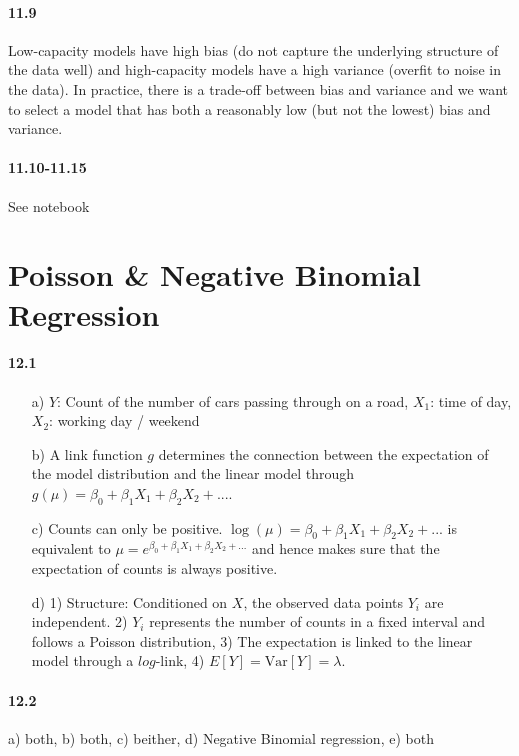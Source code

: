 \documentclass[fontsize=11pt,DIV=18,parskip=half]{scrartcl}
\begin{document}
\paragraph{11.9} Low-capacity models have high bias (do not capture the underlying structure of the data well) and high-capacity models have a high variance (overfit to noise in the data). In practice, there is a trade-off between bias and variance and we want to select a model that has both a reasonably low (but not the lowest) bias and variance.

\paragraph{11.10-11.15} See notebook

\section{Poisson \& Negative Binomial Regression}

\paragraph{12.1}
\begin{itemize}
\item[a)] $Y$: Count of the number of cars passing through on a road, $X_1$: time of day, $X_2$: working day / weekend
\item[b)] A link function $g$ determines the connection between the expectation of the model distribution and the linear model through $g(\mu) = \beta_0 + \beta_1 X_1 + \beta_2 X_2 + ...$.
\item[c)] Counts can only be positive. $\log(\mu) = \beta_0 + \beta_1 X_1 + \beta_2 X_2 + ...$ is equivalent to $\mu = e^{\beta_0 + \beta_1 X_1 + \beta_2 X_2 + ...}$ and hence makes sure that the expectation of counts is always positive.
\item[d)] 1) Structure: Conditioned on $X$, the observed data points $Y_i$ are independent. 2) $Y_i$ represents the number of counts in a fixed interval and follows a Poisson distribution, 3) The expectation is linked to the linear model through a $log$-link, 4) $E[Y] = \text{Var}[Y] = \lambda$.
\end{itemize}

\paragraph{12.2} a) both, b) both, c) beither, d) Negative Binomial regression, e) both
\end{document}
